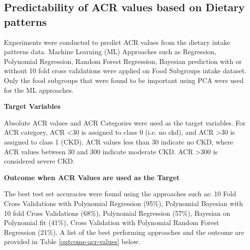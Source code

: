 \subsection{Predictability of ACR values based on Dietary patterns}
Experiments were conducted to predict ACR values from the dietary intake patterns data. Machine Learning (ML) Approaches such as Regression, Polynomial Regression, Random Forest Regression, Bayesian prediction with or without 10 fold cross validations were applied on Food Subgroups intake dataset. Only the food subgroups that were found to be important using PCA were used for the ML approaches.

\medskip
\noindent \textbf{Target Variables}

\noindent Absolute ACR values and ACR Categories were used as the target variables.  For ACR category, ACR  \textless   30 is assigned to class 0 (i.e. no ckd), and ACR  \textgreater  30 is assigned to class 1 (CKD). ACR values less than 30 indicate no CKD, where ACR values between 30 and 300 indicate moderate CKD. ACR \textgreater 300 is considered severe CKD.

\pagebreak
\noindent \textbf{Outcome when ACR Values are used as the Target }

\noindent The best test set accuracies were found using the approaches such as: 10 Fold Cross Validations with Polynomial Regression (95\%), Polynomial Bayesian with 10 fold Cross Validations (68\%), Polynomial Regression (57\%), Bayesian on Polynomial fit (41\%), Cross Validation with Polynomial Random Forest Regression (21\%). A list of the best performing approaches and the outcome are provided in Table \ref{outcome-acr-values} below. 

